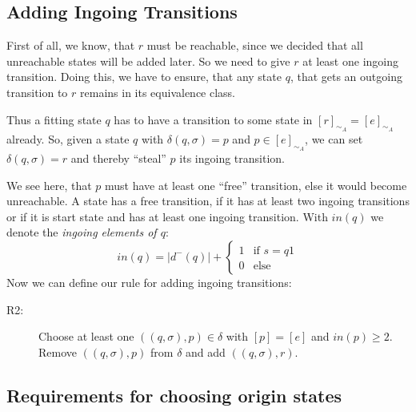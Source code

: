 \subsection{Adding Ingoing Transitions}

First of all, we know, that $r$ must be reachable, since we decided that all unreachable states will be added later. So we need to give $r$ at least one ingoing transition. Doing this, we have to ensure, that any state $q$, that gets an outgoing transition to $r$ remains in its equivalence class.

Thus a fitting state $q$ has to have a transition to some state in $[r]_{\sim_A} = [e]_{\sim_A}$ already. So, given a state $q$ with $\delta(q, \sigma) = p$ and $p \in [e]_{\sim_A}$, we can set $\delta(q, \sigma) = r$ and thereby ``steal'' $p$ its ingoing transition.

We see here, that $p$ must have at least one ``free'' transition, else it would become unreachable. A state has a free transition, if it has at least two ingoing transitions or if it is start state and has at least one ingoing transition. With $in(q)$ we denote the \emph{ingoing elements of $q$}:
\[
	in(q) = |d^-(q)| + \begin{cases}
							1 & \text{if } s = q1\\
							0 & \text{else}
						 \end{cases}
\]
Now we can define our rule for adding ingoing transitions:
\begin{description}
	\item[R2:] Choose at least one $((q, \sigma), p) \in \delta$ with $[p] = [e]$ and $in(p) \ge 2$. Remove $((q, \sigma), p)$ from $\delta$ and add $((q, \sigma), r)$.
\end{description}

\subsection{Requirements for choosing origin states}

